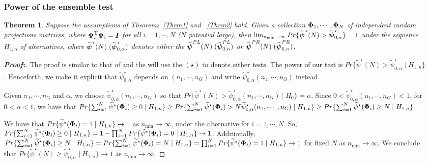 \documentclass[times,sort&compress,3p]{elsarticle}
\theoremstyle{plain}%
\newtheorem{theorem}{Theorem}
\theoremstyle{definition}
\def\boldpsi{{\mbox{\boldmath $\psi$}}}
\def\trans{^{\rm T}}
\newcommand{\uI}       {\mbox{\boldmath$I$}}
\newcommand{\uPhi}              {\mbox{\boldmath$\Phi$}}
\begin{document}
\subsubsection{Power of the ensemble test}
\begin{theorem}
Suppose the assumptions of Theorems~\ref{Thrm1} and ~\ref{Thrm2} hold.
Given a collection $\uPhi_1, \cdots, \uPhi_N$ of independent random projections matrices,
where $\uPhi_{i}\trans\uPhi_{i} = \uI$ for all $i = 1, \cdots, N$ ($N$ potential large), then $\lim_{n_{\min} \rightarrow \infty} Pr\{\widetilde{\boldpsi}^{\star}(N) > \widetilde{\boldpsi}^{\star}_{0,\alpha}\}  = 1$ under the sequence $H_{1,n}$ of alternatives,
where $\widetilde{\boldpsi}^{\star}(N)\;(\widetilde{\boldpsi}^{\star}_{0,\alpha})$ denotes either the $\widetilde{\boldpsi}^{PL}(N)\; (\widetilde{\boldpsi}^{PL}_{0,\alpha})$ or $\widetilde{\boldpsi}^{PR}(N)\;(\widetilde{\boldpsi}^{PR}_{0,\alpha})$. 
\end{theorem}
\begin{proof}[\textbf{\upshape Proof:}]
The proof is similar to that of \cite{zoh2018powerful} and the will use the $(\star)$ to denote either tests.  
The power of our test is $Pr\{ \widetilde{\psi}^{\star}(N) > \widetilde{\psi}^{\star}_{0,\alpha}\mid  H_{1,n}\}$.
Henceforth, we make it explicit that $\widetilde{\psi}^{\star}_{0,\alpha}$ depends on $(n_1, \cdots ,n_G)$ and write $\widetilde{\psi}^{\star}_{0,\alpha}(n_1, \cdots, n_G)$ instead.

Given $n_1, \cdots, n_G$ and $\alpha$, we choose $\widetilde{\psi}^{\star}_{0,\alpha}(n_1, \cdots, n_G)$ so that $Pr\{\widetilde{\psi}^{\star}(N) > \widetilde{\psi}^{\star}_{0, \alpha}(n_1, \cdots,n_G)\mid  H_{0}\}  = \alpha$.
Since $ 0 < \widetilde{\psi}^{\star}_{0,\alpha}(n_1, \cdots,n_G) < 1$, for $0 < \alpha < 1$, we have that $Pr\{ \sum^{N}_{i=1}\widetilde{\psi}^{\star}(\uPhi_i) \geq 0 \mid H_{1,n} \} \geq Pr\{ \sum^{N}_{i=1}\widetilde{\psi}^{\star}(\uPhi_i) > N\widetilde{\psi}^{\star}_{0,\alpha}(n_1, \cdots ,n_G) \mid H_{1,n} \} \geq Pr\{ \sum^{N}_{i=1}\widetilde{\psi}^{\star}(\uPhi_i) \geq N \mid H_{1,n} \}$.

We have that $Pr\{\widetilde{\psi}^{\star}(\uPhi_i) =1 \mid H_{1,n}\} \rightarrow 1$ as $n_{\min} \rightarrow \infty$, under the alternative for $i = 1, \cdots, N$. So, $Pr\{ \sum^{N}_{i=1}\widetilde{\psi}^{\star}(\uPhi_i) \geq 0 \mid H_{1,n} \} = 1 - \prod_{i=1}^{N}Pr\{\widetilde{\psi}^{\star}(\uPhi_i) = 0 \mid H_{1,n} \} \rightarrow 1$.
Additionally, $Pr\{ \sum^{N}_{i=1}\widetilde{\psi}^{\star}(\uPhi_i) \geq N \mid H_{1,n} \} = Pr\{ \sum^{N}_{i=1}\widetilde{\psi}^{\star}(\uPhi_i) = N \mid H_{1,n} \} = \prod_{i=1}^{N}Pr\{\widetilde{\psi}^{\star}(\uPhi_i) = 1 \mid H_{1,n}\} \rightarrow 1$ for fixed $N$ as $n_{\min} \rightarrow \infty$. We conclude that $Pr\{ \widetilde{\psi}^{\star}(N) \geq \widetilde{\psi}^{\star}_{0, \alpha}\mid  H_{1,n}\} \rightarrow 1$ as $n_{\min} \rightarrow \infty.$
\end{proof}
\end{document}
